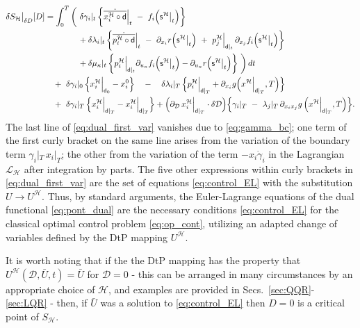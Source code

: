 \documentclass[11pt]{article}
\newcommand{\p}{\partial}
\newcommand{\dee}{\mathcal{D}}
\newcommand{\scl}{\mathcal{L}}
\newcommand{\sch}{\mathcal{H}}
\begin{document}
    \begin{align}
         \delta S_\sch\big|_{\delta D}[D] & = \int_0^T \bigg( \ \delta \gamma_i|_t \, \bigg\{ \dot{\overline{x^\sch_i \circ \mathsf{d}}}\Big|_t \ - \ f_i \Big( \mathsf{s}^\sch \big|_t \Big) \bigg\} \notag \\
        & \qquad \qquad + \delta \lambda_i|_t \, \bigg\{ \dot{\overline{p^\sch_i \circ \mathsf{d}}}\Big|_t  \ - \ \p_{x_i} r \Big( \mathsf{s}^\sch \big|_t \Big) \ + \ p^\sch_j\Big|_{ \mathsf{d}|_t} \, \p_{x_j} f_i \Big( \mathsf{s}^\sch \big|_t \Big) \bigg\} \notag\\
        & \qquad \qquad + \delta \mu_\kappa|_t \, \bigg\{ p^\sch_i \Big|_{ \mathsf{d}|_t}  \p_{u_\kappa} f_i \Big( \mathsf{s}^\sch \big|_t \Big) -  \p_{u_\kappa} r \Big(  \mathsf{s}^\sch \big|_t\Big)\bigg\}      \ \bigg) \, dt \label{eq:dual_first_var}\\
        & \quad + \ \delta \gamma_i|_0 \, \Big\{  x^\sch_i \Big|_{\mathsf{d}_0} - x_i^0 \Big\} \quad - \quad \delta \lambda_i|_T \, \Big\{ p^\sch_i\Big|_{ \mathsf{d}|_T}  + \p_{x_i} g \Big( x^\sch \Big|_{ \mathsf{d}|_T}, T \Big) \Big\} \notag\\
        & \quad + \ \delta \gamma_i|_T \, \Big\{  x^\sch_i \Big|_{ \mathsf{d}|_T} - x^\sch_i \Big|_{ \mathsf{d}|_T} \Big\} + \Big( \p_\dee \, x^\sch_i\Big|_{ \mathsf{d}|_T} \cdot \delta \dee \Big) \Big\{ \gamma_i|_T \ - \ \lambda_j|_T \, \p_{x_i x_j} g \, \Big( x^\sch \Big|_{ \mathsf{d}|_T} , T \Big) \Big\}. \notag
    \end{align}
\endgroup
The last line of \eqref{eq:dual_first_var} vanishes due to \eqref{eq:gamma_bc}; one term of the first curly bracket on the same line arises from the variation of the boundary term $\gamma_i|_T \, x_i|_T $; the other from the variation of the term $- x_i \dot{\gamma}_i$ in the Lagrangian $\scl_\sch$ after integration by parts. The five other expressions within curly brackets in \eqref{eq:dual_first_var} are the set of equations \eqref{eq:control_EL} with the substitution $U \to U^\sch$. Thus, by standard arguments, the Euler-Lagrange equations of the dual functional \eqref{eq:pont_dual} are the necessary conditions \eqref{eq:control_EL} for the classical optimal control problem \eqref{eq:op_cont}, utilizing an adapted change of variables defined by the DtP mapping $U^\sch$.

It is worth noting that if the the DtP mapping has the property that $U^\sch (\dee,\bar{U},t) = \bar{U}$ for $\dee = 0$ - this can be arranged in many circumstances by an appropriate choice of $\sch$, and examples are provided in Secs.~\ref{sec:QQR}-\ref{sec:LQR} - then, if $\bar{U}$ was a solution to \eqref{eq:control_EL} then $D= 0$ is a critical point of $S_\sch$.
\end{document}
